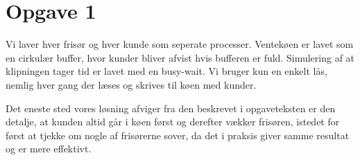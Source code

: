 



\maketitle

\tableofcontents

\thispagestyle{empty}

\section{Opgave 1}
Vi laver hver frisør og hver kunde som seperate processer. Ventekøen er lavet
som en cirkulær buffer, hvor kunder bliver afvist hvis bufferen er fuld. Simulering af at klipningen tager tid er lavet med en busy-wait. Vi bruger kun en enkelt lås, nemlig hver gang der læses og skrives til køen med kunder.

Det eneste sted vores løsning afviger fra den beskrevet i opgaveteksten er den detalje, at kunden altid går i køen først og derefter vækker frisøren, istedet for først at tjekke om nogle af frisørerne sover, da det i praksis giver samme resultat og er mere effektivt.



